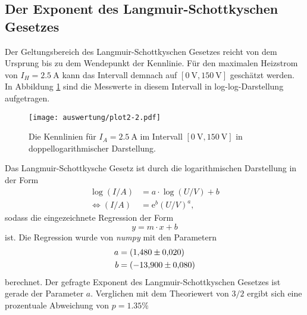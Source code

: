 \subsection{Der Exponent des Langmuir-Schottkyschen Gesetzes}
\label{sec:langschott}
Der Geltungsbereich des Langmuir-Schottkyschen Gesetzes reicht von dem Ursprung bis zu dem Wendepunkt der Kennlinie. Für den maximalen Heizstrom
von $I_H=\SI{2.5}{\ampere}$ kann das Intervall demnach auf $[\SI{0}{\volt}, \SI{150}{\volt}]$ geschätzt werden. In Abbildung \ref{fig:plot2} sind 
die Messwerte in diesem Intervall in log-log-Darstellung aufgetragen. 
\begin{figure}[H]
    \centering
    \texttt{[image: auswertung/plot2-2.pdf]}
    \caption{Die Kennlinien für $I_A=\SI{2.5}{\ampere}$ im Intervall $[\SI{0}{\volt}, \SI{150}{\volt}]$ in doppellogarithmischer Darstellung.}
    \label{fig:plot2}
\end{figure}
\noindent
Das Langmuir-Schottkysche Gesetz ist durch die logarithmischen Darstellung in der Form 
\begin{align*}
    \log(I/A)&=a\cdot \log(U/V)+b\\
    \Leftrightarrow
    (I/A)&=\text{e}^b(U/V)^{a},  %
\end{align*}
sodass die eingezeichnete Regression der Form 
\begin{equation}
    y=m\cdot x+b
    \label{eqn:gerade}
\end{equation}
ist. Die Regression wurde von \textit{numpy} \cite{numpy} mit den Parametern
\begin{align*}
    a &= \SI{1.48   \pm 0.020}{} \\
    b &= \SI{-13.90 \pm 0.080}{} %
\end{align*}
berechnet. Der gefragte Exponent des Langmuir-Schottkyschen Gesetzes ist gerade der Parameter $a$. Verglichen mit dem Theoriewert von $3/2$ 
ergibt sich eine prozentuale Abweichung von $p=\num{1.35}\%$

